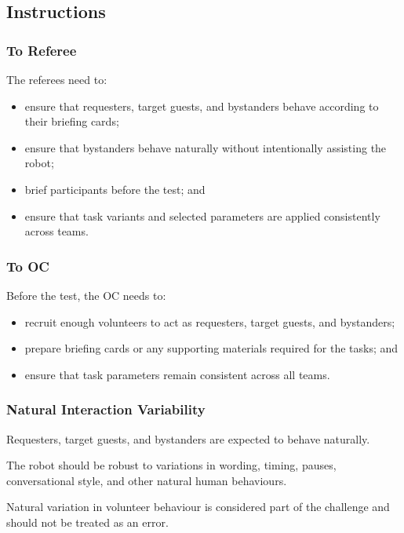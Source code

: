 \subsection*{Instructions}

\subsubsection*{To Referee}
The referees need to:
\begin{itemize}
	\item ensure that requesters, target guests, and bystanders behave according to their briefing cards;
	\item ensure that bystanders behave naturally without intentionally assisting the robot;
	\item brief participants before the test; and
	\item ensure that task variants and selected parameters are applied consistently across teams.
\end{itemize}

\subsubsection*{To OC}
Before the test, the OC needs to:
\begin{itemize}
	\item recruit enough volunteers to act as requesters, target guests, and bystanders;
	\item prepare briefing cards or any supporting materials required for the tasks; and
	\item ensure that task parameters remain consistent across all teams.
\end{itemize}

\subsubsection*{Natural Interaction Variability}
Requesters, target guests, and bystanders are expected to behave naturally.

The robot should be robust to variations in wording, timing, pauses, conversational style, and other natural human behaviours.

Natural variation in volunteer behaviour is considered part of the challenge and should not be treated as an error.

